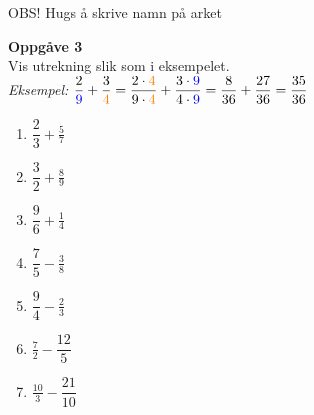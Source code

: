 \documentclass[english,hidelinks,pdftex, 11 pt, class=report,crop=false]{standalone}
\begin{document}
\newpage	
\footnotesize OBS! Hugs å skrive namn på arket \\[25pt]
\large

{\Large \textbf{Oppgåve 3}}\\[10pt]
Vis utrekning slik som i eksempelet. \\[10pt]
\textit{Eksempel:} $ \displaystyle
\frac{2}{\color{blue}9}+\frac{3}{\color{orange}4}=\frac{2\cdot \color{orange}4}{9\cdot\color{orange}4}+\frac{3\cdot\color{blue}9}{4\cdot\color{blue}9}=\frac{8}{36}+\frac{27}{36}=\frac{35}{36}$ \\[10pt]
\begin{enumerate}[label=\alph*)]
	\item $\displaystyle \dfrac{2}{3}+\frac{5}{7} $\\[15pt]
	\item $\displaystyle \dfrac{3}{2}+\frac{8}{9}$\\[15pt]
	\item $\displaystyle \dfrac{9}{6}+\frac{1}{4} $\\[15pt]
	\item $\displaystyle \dfrac{7}{5}-\frac{3}{8} $\\[15pt]	
	\item $\displaystyle \dfrac{9}{4}-\frac{2}{3} $\\[15pt]
	\item $\displaystyle \frac{7}{2}-\dfrac{12}{5} $\\[15pt]	
	\item $\displaystyle \frac{10}{3}-\dfrac{21}{10} $\\[15pt]		
\end{enumerate}
\end{document}
